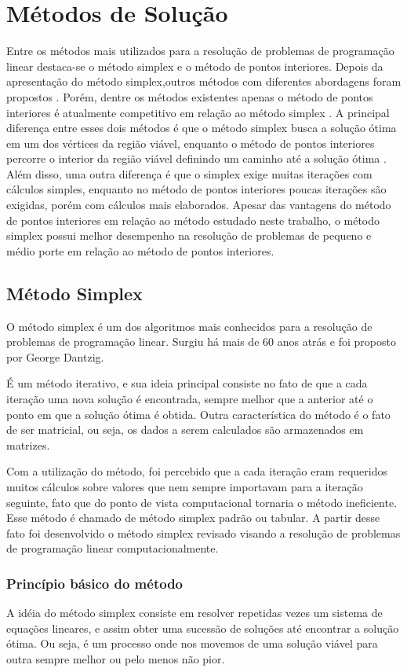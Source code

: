 \chapter{Métodos de Solução}
Entre os métodos mais utilizados para a resolução de problemas de programação linear destaca-se o método simplex  e o método de pontos interiores. 
Depois da apresentação do método simplex,outros métodos com diferentes abordagens foram propostos \cite{Todd}. Porém, dentre os métodos existentes apenas o método de pontos interiores é atualmente competitivo em relação ao método simplex \cite{Bixby}. 
A principal diferença entre esses dois métodos é que o método simplex busca a solução ótima em um dos vértices da região viável, enquanto o método de pontos interiores percorre o interior da região viável definindo um caminho até a solução ótima \cite{MaculanPI}. Além disso, uma outra diferença é que o simplex exige muitas iterações com cálculos simples, enquanto no método de pontos interiores poucas iterações são exigidas, porém com cálculos mais elaborados.
Apesar das vantagens do método de pontos interiores em relação ao método estudado neste trabalho, o método simplex possui melhor desempenho na resolução de problemas de pequeno e médio porte em relação ao método de pontos interiores.

\section{Método Simplex}
O método simplex é um dos algoritmos mais conhecidos para a resolução de problemas de programação linear. Surgiu há mais de 60 anos atrás e foi proposto por George Dantzig.  

É um método iterativo, e sua ideia principal consiste no fato de que a cada iteração uma nova solução é encontrada, sempre melhor que a anterior até o ponto em que a solução ótima é obtida. Outra característica do método é o fato de ser matricial, ou seja, os dados a serem calculados são armazenados em matrizes.  

Com a utilização do método, foi percebido que a cada iteração eram requeridos muitos cálculos sobre valores que nem sempre importavam para a iteração seguinte, fato que do ponto de vista computacional tornaria o método ineficiente. Esse método é chamado de método simplex padrão ou tabular. A partir desse fato foi desenvolvido o método simplex revisado visando a resolução de problemas de programação linear computacionalmente.

\subsection{Princípio básico do método}
A idéia do método simplex consiste em resolver repetidas vezes um sistema de equações lineares, e assim obter uma sucessão de soluções até encontrar a solução ótima. Ou seja, é um processo onde nos movemos de uma solução viável para outra sempre melhor ou pelo menos não pior.

